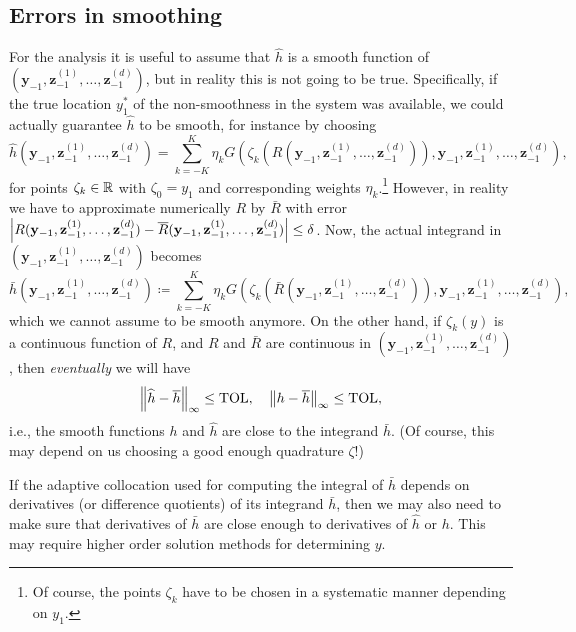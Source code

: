 \subsection{Errors in smoothing}
\label{sec:errors-smoothing}

For the analysis it is useful to assume that $\hat{h}$ is a smooth function of $(\mathbf{y}_{-1},\mathbf{z}^{(1)}_{-1},\dots,\mathbf{z}^{(d)}_{-1} )$, but in reality this is not going to be true. Specifically, if the true location $y_1^\ast$ of the non-smoothness in the system was available, we could actually guarantee $\hat{h}$ to be smooth, for instance by choosing 
\begin{equation*}
	\hat{h}(\mathbf{y}_{-1},\mathbf{z}^{(1)}_{-1},\dots,\mathbf{z}^{(d)}_{-1}  ) = \sum_{k=-K}^{K} \eta_k G\left( \zeta_k(R(\mathbf{y}_{-1},\mathbf{z}^{(1)}_{-1},\dots,\mathbf{z}^{(d)}_{-1} )),
	\mathbf{y}_{-1},\mathbf{z}^{(1)}_{-1},\dots,\mathbf{z}^{(d)}_{-1}   \right),
\end{equation*}
for points $\zeta_k \in \mathbb{R}$ with $\zeta_0 = y_1$ and corresponding weights
$\eta_k$.\footnote{Of course, the points $\zeta_k$ have to be chosen in a
	systematic manner depending on $y_1$.} However, in reality we have to approximate numerically $R$ by $\bar{R}$ with error
$\left\lvert R(\mathbf{y}_{-1},\mathbf{z}^{(1)}_{-1},\dots,\mathbf{z}^{(d)}_{-1}) - \overline{R}(\mathbf{y}_{-1},\mathbf{z}^{(1)}_{-1},\dots,\mathbf{z}^{(d)}_{-1}  )\right\rvert \le \delta$. Now, the actual integrand in $(\mathbf{y}_{-1},\mathbf{z}^{(1)}_{-1},\dots,\mathbf{z}^{(d)}_{-1})$ becomes 
\begin{equation*}
	\bar{h}(\mathbf{y}_{-1},\mathbf{z}^{(1)}_{-1},\dots,\mathbf{z}^{(d)}_{-1}  ) \coloneqq \sum_{k=-K}^{K} \eta_k G\left( \zeta_k(\bar{R}(\mathbf{y}_{-1},\mathbf{z}^{(1)}_{-1},\dots,\mathbf{z}^{(d)}_{-1} )),
	\mathbf{y}_{-1},\mathbf{z}^{(1)}_{-1},\dots,\mathbf{z}^{(d)}_{-1}   \right),
\end{equation*}
which we cannot assume to be smooth anymore. On the other hand, if
$\zeta_k(y)$ is a continuous function of $R$, and $R$ and $\bar{R}$ are continuous in $(\mathbf{y}_{-1},\mathbf{z}^{(1)}_{-1},\dots,\mathbf{z}^{(d)}_{-1}  )$, then \emph{eventually} we will have
\begin{equation*}
	\left\lVert\widehat{h} - \overline{h}\right\rVert_\infty \le \mathrm{TOL}, \quad \left\lVert h - \overline{h}\right\rVert_\infty
	\le \mathrm{TOL}, 
\end{equation*}
i.e., the smooth functions $h$ and $\hat{h}$ are close to the integrand $\bar{h}$. (Of course, this may depend on us choosing a good enough quadrature
$\zeta$!) 
\begin{remark}
	If the adaptive collocation used for computing the integral of $\bar{h}$
	depends on derivatives (or difference quotients) of its integrand $\bar{h}$,
	then we may also need to make sure that derivatives of $\bar{h}$ are close
	enough to derivatives of $\hat{h}$ or $h$. This may require higher order
	solution methods for determining $y$.
\end{remark}


